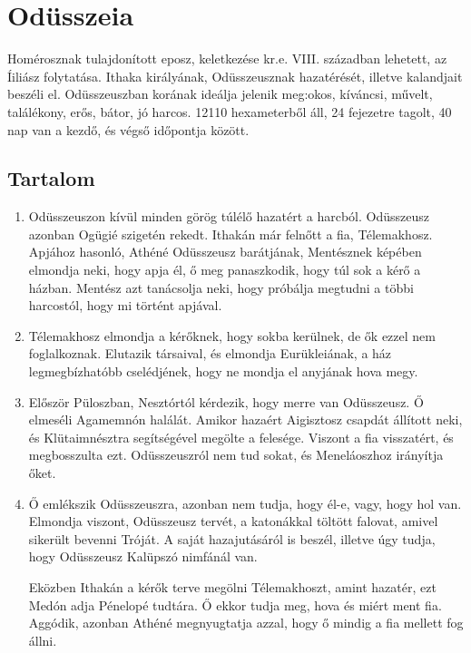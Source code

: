 \documentclass[]{article}
\begin{document}
	\section{Odüsszeia}
		Homérosznak tulajdonított eposz, keletkezése kr.e. VIII. században lehetett, az Íiliász folytatása. Ithaka királyának, Odüsszeusznak hazatérését, illetve kalandjait beszéli el. Odüsszeuszban korának ideálja jelenik meg:okos, kíváncsi, művelt, találékony, erős, bátor, jó harcos. 12110 hexameterből áll, 24 fejezetre tagolt, 40 nap van a kezdő, és végső időpontja között.\cite{WOdusszeia}
		\subsection{Tartalom}
			\begin{enumerate}
				\item Odüsszeuszon kívül minden görög túlélő hazatért a harcból. Odüsszeusz azonban Ogügié szigetén rekedt. Ithakán már felnőtt a fia, Télemakhosz. Apjához hasonló, Athéné Odüsszeusz barátjának, Mentésznek képében elmondja neki, hogy apja él, ő meg panaszkodik, hogy túl sok a kérő a házban. Mentész azt tanácsolja neki, hogy próbálja megtudni a többi harcostól, hogy mi történt apjával.
				
				\item Télemakhosz elmondja a kérőknek, hogy sokba kerülnek, de ők ezzel nem foglalkoznak. Elutazik társaival, és elmondja Eurükleiának, a ház legmegbízhatóbb cselédjének, hogy ne mondja el anyjának hova megy.
				
				\item Először Püloszban, Nesztórtól kérdezik, hogy merre van Odüsszeusz. Ő elmeséli Agamemnón halálát. Amikor hazaért Aigisztosz csapdát állított neki, és Klütaimnésztra segítségével megölte a felesége. Viszont a fia visszatért, és megbosszulta ezt. Odüsszeuszról nem tud sokat, és Meneláoszhoz irányítja őket.
				
				\item Ő emlékszik Odüsszeuszra, azonban nem tudja, hogy él-e, vagy, hogy hol van. Elmondja viszont, Odüsszeusz tervét, a katonákkal töltött falovat, amivel sikerült bevenni Tróját. A saját hazajutásáról is beszél, illetve úgy tudja, hogy Odüsszeusz Kalüpszó nimfánál van. 
				
				Eközben Ithakán a kérők terve megölni Télemakhoszt, amint hazatér, ezt Medón adja Pénelopé tudtára. Ő ekkor tudja meg, hova és miért ment fia. Aggódik, azonban Athéné megnyugtatja azzal, hogy ő mindig a fia mellett fog állni.
			\end{enumerate}
			\cite{Odusszeia_tartalom}


\end{document}
